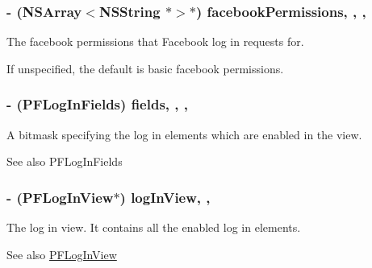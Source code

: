 \subsubsection[{facebook\+Permissions}]{\setlength{\rightskip}{0pt plus 5cm}-\/ (N\+S\+Array$<$N\+S\+String $\ast$$>$$\ast$) facebook\+Permissions\hspace{0.3cm}{\ttfamily [read]}, {\ttfamily [write]}, {\ttfamily [nonatomic]}, {\ttfamily [copy]}}\label{interface_p_f_log_in_view_controller_a5663b4bc64642b625eb8369bb09c1ff4}
The facebook permissions that Facebook log in requests for.

If unspecified, the default is basic facebook permissions. \hypertarget{interface_p_f_log_in_view_controller_a9e150a6faf7e08e6bcfb5f120c02ba6f}{}
\subsubsection[{fields}]{\setlength{\rightskip}{0pt plus 5cm}-\/ (P\+F\+Log\+In\+Fields) fields\hspace{0.3cm}{\ttfamily [read]}, {\ttfamily [write]}, {\ttfamily [nonatomic]}, {\ttfamily [assign]}}\label{interface_p_f_log_in_view_controller_a9e150a6faf7e08e6bcfb5f120c02ba6f}
A bitmask specifying the log in elements which are enabled in the view.

\begin{DoxySeeAlso}{See also}
P\+F\+Log\+In\+Fields 
\end{DoxySeeAlso}
\hypertarget{interface_p_f_log_in_view_controller_a705c69f6a99cfaf962831623b4d6ccff}{}
\subsubsection[{log\+In\+View}]{\setlength{\rightskip}{0pt plus 5cm}-\/ ({\bf P\+F\+Log\+In\+View}$\ast$) log\+In\+View\hspace{0.3cm}{\ttfamily [read]}, {\ttfamily [nonatomic]}, {\ttfamily [strong]}}\label{interface_p_f_log_in_view_controller_a705c69f6a99cfaf962831623b4d6ccff}
The log in view. It contains all the enabled log in elements.

\begin{DoxySeeAlso}{See also}
\hyperlink{interface_p_f_log_in_view}{P\+F\+Log\+In\+View} 
\end{DoxySeeAlso}
\hypertarget{interface_p_f_log_in_view_controller_a3b23bb61ef95e3e9418f2f6d29420425}{}

